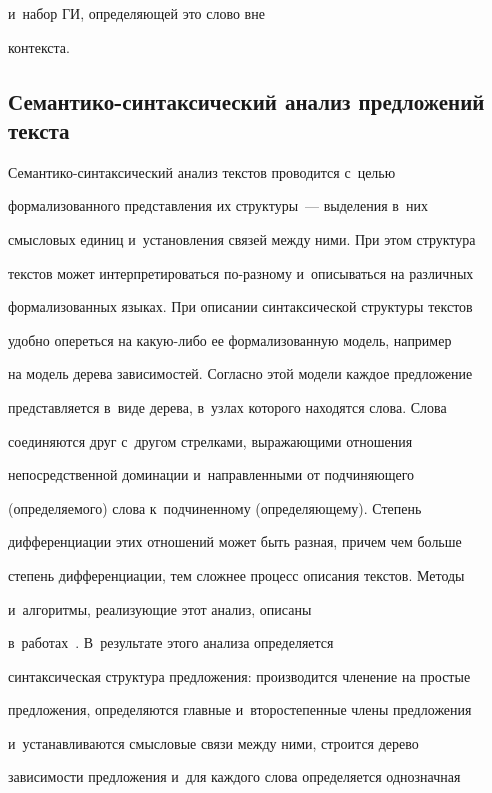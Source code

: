 и~набор ГИ, определяющей это слово вне 


контекста.


  


\subsection{Семантико-синтаксический анализ предложений текста}





  Семантико-синтаксический анализ текстов проводится с~целью 


формализованного представления их структуры~--- выделения в~них 


смысловых единиц и~установления связей между ними. При этом структура 


текстов может интерпретироваться по-разному и~описываться на различных 


формализованных языках. При описании синтаксической структуры текстов 


удобно опереться на ка\-кую-ли\-бо ее формализованную модель, например 


на модель дерева зависимостей. Согласно этой модели каждое предложение 


представляется в~виде дерева, в~узлах которого находятся слова. Слова 


соединяются друг с~другом стрелками, выражающими отношения 


непосредственной доминации и~направленными от подчиняющего 


(определяемого) слова к~подчиненному (определяющему). Степень 


дифференциации этих отношений может быть разная, причем чем больше 


степень дифференциации, тем сложнее процесс описания текстов. Методы 


и~алгоритмы, реализующие этот анализ, описаны  


в~работах~\cite{3-kl, 2-kl, 1-kl}. В~результате этого анализа определяется 


синтаксическая структура предложения: производится членение на простые 


предложения, определяются главные и~второстепенные члены предложения 


и~устанавливаются смысловые связи между ними, строится дерево 


зависимости предложения и~для каждого слова определяется однозначная 


